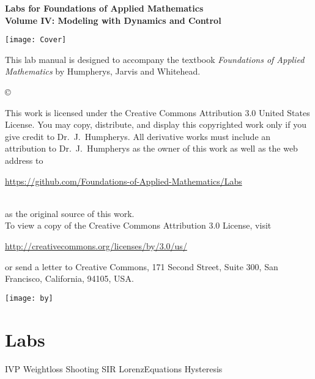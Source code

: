 \documentclass[nociteref]{SIAM-GH-book}
\begin{document}

\thispagestyle{empty} %

\begin{center}
{\huge \bf Labs for Foundations of Applied Mathematics} \\
\vspace{5mm}
{\Large \bf Volume IV: Modeling with Dynamics and Control}
\vspace{20mm}

\texttt{[image: Cover]}
\end{center}
\frontmatter



\begin{thepreface} %

This lab manual is designed to accompany the textbook \emph{Foundations of Applied Mathematics} by Humpherys, Jarvis and Whitehead.

\vfill
\copyright{This work is licensed under the Creative Commons Attribution 3.0 United States
License.  You may copy, distribute, and display this copyrighted work only if you give
credit to Dr.~J.~Humpherys. All derivative works must include an attribution to Dr.~J.~Humpherys as the owner of this work as well as the web address to
\\\centerline{\url{https://github.com/Foundations-of-Applied-Mathematics/Labs}}\\as the original source of this work.
\\To view a copy of the Creative Commons Attribution 3.0 License, visit
\\\centerline{\url{http://creativecommons.org/licenses/by/3.0/us/}} or send a letter to Creative Commons, 171 Second Street, Suite 300, San Francisco, California, 94105, USA.}

\vfill
\centering\texttt{[image: by]}
\vfill
\end{thepreface}

\setcounter{tocdepth}{1}
\tableofcontents

\mainmatter %

\part{Labs}
{IVP}
{Weightloss}
{Shooting}
{SIR}
{LorenzEquations}
{Hysteresis}
\end{document}
